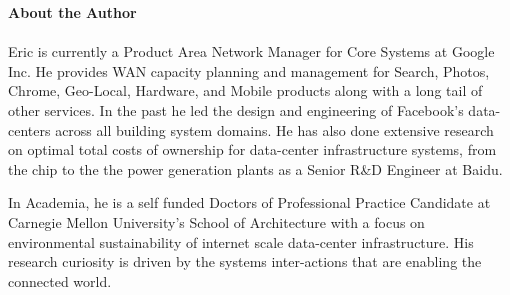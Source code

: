 \documentclass[conference]{IEEEtran}
\begin{document}
\vspace{12pt}
\color{blue}
\textbf{About the Author} \\
\\
Eric is currently a Product Area Network Manager for Core Systems at Google Inc. He provides WAN capacity planning and management for Search, Photos, Chrome, Geo-Local, Hardware, and Mobile products along with a long tail of other services. In the past he led the design and engineering of Facebook's data-centers across all building system domains. He has also done extensive research on optimal total costs of ownership for data-center infrastructure systems, from the chip to the the power generation plants as a Senior R\&D Engineer at Baidu.

In Academia, he is a self funded Doctors of Professional Practice Candidate at Carnegie Mellon University's School of Architecture with a focus on environmental sustainability of internet scale data-center infrastructure. His research curiosity is driven by the systems inter-actions that are enabling the connected world.
\end{document}
